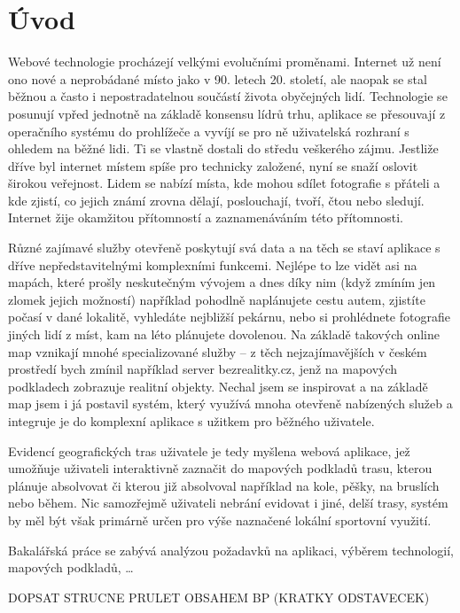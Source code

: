 \chapter*{Úvod}

Webové technologie procházejí velkými evolučními proměnami. Internet
už není ono nové a neprobádané místo jako v 90. letech 20.
století, ale naopak se stal běžnou a často i nepostradatelnou
součástí života obyčejných lidí. Technologie se posunují vpřed
jednotně na základě konsensu lídrů trhu, aplikace se přesouvají z
operačního systému do prohlížeče a vyvíjí se pro ně uživatelská
rozhraní s ohledem na běžné lidi. Ti se vlastně dostali do středu
veškerého zájmu. Jestliže dříve byl internet místem spíše pro
technicky založené, nyní se snaží oslovit širokou veřejnost. Lidem se
nabízí místa, kde mohou sdílet fotografie s přáteli a kde zjistí, co
jejich známí zrovna dělají, poslouchají, tvoří, čtou nebo sledují. Internet žije
okamžitou přítomností a zaznamenáváním této přítomnosti.

Různé zajímavé služby otevřeně poskytují svá data a na těch se staví
aplikace s dříve nepředstavitelnými komplexními funkcemi. Nejlépe to lze vidět
asi na mapách, které prošly neskutečným vývojem a dnes díky nim (když
zmíním jen zlomek jejich možností) například pohodlně naplánujete
cestu autem, zjistíte počasí v dané lokalitě, vyhledáte nejbližší
pekárnu, nebo si prohlédnete fotografie jiných lidí z míst, kam na
léto plánujete dovolenou. Na základě takových online map vznikají
mnohé specializované služby -- z těch nejzajímavějších v českém
prostředí bych zmínil například server bezrealitky.cz, jenž na
mapových podkladech zobrazuje realitní objekty. Nechal jsem se
inspirovat a na základě map jsem i já postavil systém, který využívá
mnoha otevřeně nabízených služeb a integruje je do komplexní aplikace
s užitkem pro běžného uživatele.

Evidencí geografických tras uživatele je tedy myšlena webová aplikace,
jež umožňuje uživateli interaktivně zaznačit do mapových podkladů trasu,
kterou plánuje absolvovat či kterou již absolvoval například na kole,
pěšky, na bruslích nebo během. Nic samozřejmě uživateli nebrání
evidovat i jiné, delší trasy, systém by měl být však primárně určen
pro výše naznačené lokální sportovní využití.

Bakalářská práce se zabývá analýzou požadavků na aplikaci, výběrem
technologií, mapových podkladů, \ldots

DOPSAT STRUCNE PRULET OBSAHEM BP (KRATKY ODSTAVECEK)

